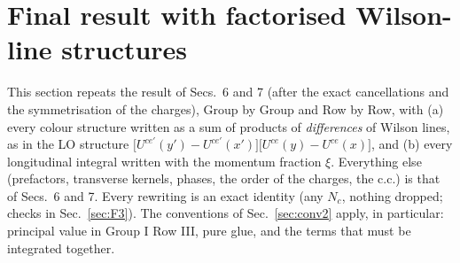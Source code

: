 \documentclass[9pt]{article}
\numberwithin{equation}{section}
\begin{document}
\section{Final result with factorised Wilson-line structures}\label{sec:F}
\noindent This section repeats the result of Secs.~6 and 7 (after the exact cancellations and the symmetrisation of the charges), Group by Group and Row by Row, with (a) every colour structure written as a sum of products of \emph{differences} of Wilson lines, as in the LO structure $\big[U^{ce'}(y')-U^{ce'}(x')\big]\big[U^{ce}(y)-U^{ce}(x)\big]$, and (b) every longitudinal integral written with the momentum fraction $\xi$. Everything else (prefactors, transverse kernels, phases, the order of the charges, the c.c.) is that of Secs.~6 and 7. Every rewriting is an exact identity (any $N_{c}$, nothing dropped; checks in Sec.~\ref{sec:F3}). The conventions of Sec.~\ref{sec:conv2} apply, in particular: principal value in Group I Row III, pure glue, and the terms that must be integrated together.
\end{document}
